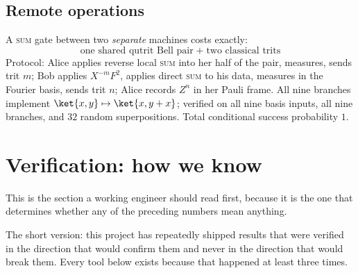 \subsection{Remote operations}

\begin{spec}
A \textsc{sum} gate between two \emph{separate} machines costs exactly:
\[
  \boxed{\text{one shared qutrit Bell pair} \;+\; \text{two classical trits}}
\]
Protocol: Alice applies reverse local \textsc{sum} into her half of the pair, measures,
sends trit $m$; Bob applies $X^{-m}F^2$, applies direct \textsc{sum} to his data, measures
in the Fourier basis, sends trit $n$; Alice records $Z^n$ in her Pauli frame. All nine
branches implement $\ket{x,y}\mapsto\ket{x,y+x}$; verified on all nine basis inputs, all
nine branches, and $32$ random superpositions. Total conditional success probability $1$.
\end{spec}

\section{Verification: how we know}\label{sec:verification}

\begin{plain}
This is the section a working engineer should read first, because it is the one that
determines whether any of the preceding numbers mean anything.

The short version: this project has repeatedly shipped results that were verified in the
direction that would confirm them and never in the direction that would break them. Every
tool below exists because that happened at least three times.
\end{plain}

